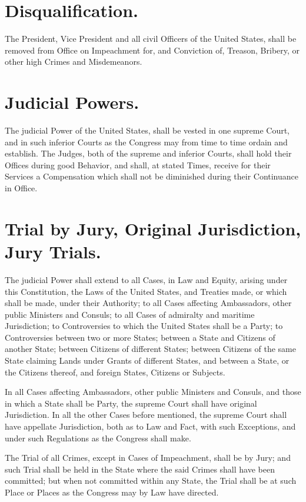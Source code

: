 \documentclass[12pt]{constitution}
\begin{document}
\section{Disqualification.}
The President, Vice President and all civil Officers of the United States,
shall be removed from Office on Impeachment for, and Conviction of, Treason,
Bribery, or other high Crimes and Misdemeanors.




\section{Judicial Powers.}
The judicial Power of the United States, shall be vested in one supreme Court,
and in such inferior Courts as the Congress may from time to time ordain and
establish. The Judges, both of the supreme and inferior Courts, shall hold
their Offices during good Behavior, and shall, at stated Times, receive for
their Services a Compensation which shall not be diminished during their
Continuance in Office.


\section{Trial by Jury, Original Jurisdiction, Jury Trials.}
The judicial Power shall extend to all Cases, in Law and Equity, arising under
this Constitution, the Laws of the United States, and Treaties made, or which
shall be made, under their Authority; to all Cases affecting Ambassadors, other
public Ministers and Consuls; to all Cases of admiralty and maritime
Jurisdiction; to Controversies to which the United States shall be a Party; to
Controversies between two or more States; between a State and Citizens of
another State; between Citizens of different States; between Citizens of the
same State claiming Lands under Grants of different States, and between a
State, or the Citizens thereof, and foreign States, Citizens or Subjects.

In all Cases affecting Ambassadors, other public Ministers and Consuls, and
those in which a State shall be Party, the supreme Court shall have original
Jurisdiction. In all the other Cases before mentioned, the supreme Court shall
have appellate Jurisdiction, both as to Law and Fact, with such Exceptions, and
under such Regulations as the Congress shall make.

The Trial of all Crimes, except in Cases of Impeachment, shall be by Jury; and
such Trial shall be held in the State where the said Crimes shall have been
committed; but when not committed within any State, the Trial shall be at such
Place or Places as the Congress may by Law have directed.
\end{document}
